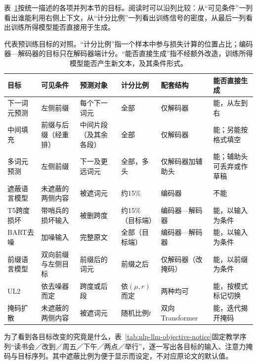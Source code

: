 表~\ref{tab:nlp-llm-objective-comparison}按统一描述的各项并列本节的目标。阅读时可以沿列比较：从“可见条件”一列看出谁能利用右侧上下文，从“计分比例”一列看出训练信号的密度，从最后一列看出训练所得模型能否直接用于生成。

\begin{table}[!b]
 \small
 \begin{tabularx}{\linewidth}{@{}p{20mm}p{30mm}p{26mm}p{18mm}p{22mm}X@{}}
  \toprule
  目标 & 可见条件 & 预测对象 & 计分比例 & 配套结构 & 能否直接生成\\
  \midrule
  下一词元预测 & 左侧前缀 & 每个下一词元 & 全部 & 仅解码器 & 能，从左到右\\
  中间填充 & 前缀与后缀（经重排） & 中间片段（及其余各段） & 全部 & 仅解码器 & 能；另能按格式填空\\
  多词元预测 & 左侧前缀 & 下一及更远词元 & 全部，多头 & 仅解码器加辅助头 & 能；辅助头可丢弃或作草稿\\
  遮蔽语言模型 & 未遮蔽的两侧内容 & 被遮词元 & 约15\% & 编码器 & 不能\\
  T5跨度损坏 & 带哨兵的损坏输入 & 被删跨度 & 约15\%（目标端） & 编码器—解码器 & 能，以输入为条件\\
  BART去噪 & 加噪输入 & 完整原文 & 全部（目标端） & 编码器—解码器 & 能，以输入为条件\\
  前缀语言模型 & 双向前缀与左侧目标 & 前缀后的词元 & 前缀之后 & 仅解码器（改掩码） & 能，以前缀为条件\\
  UL2 & 依去噪器而定 & 跨度或后段 & 依$(\mu,r)$而定 & 两种均可 & 能，按模式标记切换\\
  掩码扩散 & 未遮蔽的两侧内容 & 被遮词元 & 随机比例$t$ & 双向Transformer & 能，迭代揭开掩码\\
  \bottomrule
 \end{tabularx}
 \caption{代表预训练目标的对照。“计分比例”指一个样本中参与损失计算的位置占比；编码器—解码器的目标只在解码器端计分。“能否直接生成”指不经额外改造，训练所得模型能否产生新文本，及其条件形式。}
 \label{tab:nlp-llm-objective-comparison}
\end{table}

为了看到各目标改变的究竟是什么，表~\ref{tab:nlp-llm-objective-notice}固定教学序列“读书会／改到／周五／下午／两点／举行”，逐一写出各目标的输入、注意力掩码与目标序列。其中遮蔽比例为便于显示而设定，不对应原论文的默认值。

